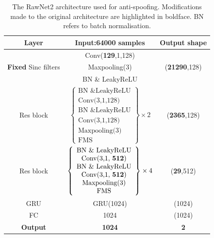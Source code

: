 \documentclass{article}
\begin{document}
 \begin{table}[!t]
\small
	\centering

	\caption{The RawNet2 architecture used for anti-spoofing. Modifications made to the original architecture are highlighted in boldface. BN refers to batch normalisation.}
 \setlength\tabcolsep{3.5pt}
	\begin{tabular}{ *{3}{c}}
	\hline
	Layer & Input:{\bfseries 64000} samples & Output shape\\
	\hline
	& Conv(\textbf{129},1,128)& \\
	\textbf{Fixed} Sinc filters&Maxpooling(3)&({\bfseries 21290},128)\\
	& BN \& LeakyReLU&\\
	\hline
	
	Res block & 
	    
	{$ \left \{ 
	\begin{array}{c}
	\text{BN  \&  LeakyReLU} \\
	   \text{Conv(3,1,128)} \\
	  \text{BN  \& LeakyReLU} \\
	  \text{Conv(3,1,128)}\\
	   \text{Maxpooling(3)}\\ 
	   \text{FMS}
	\end{array} \right \} 
	  
	  \times 2$} & ({\bfseries 2365},128) \\
	\hline
  Res block & 
  {$ \left \{ 
	\begin{array}{c}
	\text{BN  \&  LeakyReLU} \\
	   \text{Conv(3,1, \textbf{512})} \\
	  \text{BN \& LeakyReLU} \\
	  \text{Conv(3,1, \textbf{512})}\\
	   \text{Maxpooling(3)}\\ 
	   \text{FMS}
	\end{array} 
	 \right \} \times 4$} &({\bfseries 29},512) \\
	 \hline
	 GRU & GRU(1024)&(1024)\\
	 \hline
	 FC&1024&(1024)\\
	 \hline
	 \textbf{Output}&\textbf{1024}&\textbf{2}\\
	 \hline
	\end{tabular}
	\label{Tab:RawNet details}
	\vspace{-0.15cm}
\end{table}
\end{document}

